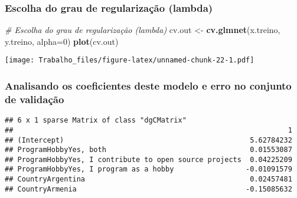 \documentclass[]{article}
\newenvironment{Shaded}{\begin{snugshade}}{\end{snugshade}}
\newcommand{\KeywordTok}[1]{\textcolor[rgb]{0.13,0.29,0.53}{\textbf{#1}}}
\newcommand{\DataTypeTok}[1]{\textcolor[rgb]{0.13,0.29,0.53}{#1}}
\newcommand{\DecValTok}[1]{\textcolor[rgb]{0.00,0.00,0.81}{#1}}
\newcommand{\StringTok}[1]{\textcolor[rgb]{0.31,0.60,0.02}{#1}}
\newcommand{\CommentTok}[1]{\textcolor[rgb]{0.56,0.35,0.01}{\textit{#1}}}
\newcommand{\OperatorTok}[1]{\textcolor[rgb]{0.81,0.36,0.00}{\textbf{#1}}}
\newcommand{\NormalTok}[1]{#1}
\begin{document}
\subsubsection{Escolha do grau de regularização
(lambda)}\label{escolha-do-grau-de-regularizacao-lambda}

\begin{Shaded}
\begin{Highlighting}[]
\CommentTok{# Escolha do grau de regularização (lambda)}
\NormalTok{cv.out <-}\StringTok{ }\KeywordTok{cv.glmnet}\NormalTok{(x.treino, y.treino, }\DataTypeTok{alpha=}\DecValTok{0}\NormalTok{)}
\KeywordTok{plot}\NormalTok{(cv.out)}
\end{Highlighting}
\end{Shaded}

\texttt{[image: Trabalho\_files/figure-latex/unnamed-chunk-22-1.pdf]}

\subsubsection{Analisando os coeficientes deste modelo e erro no
conjunto de
validação}\label{analisando-os-coeficientes-deste-modelo-e-erro-no-conjunto-de-validacao}

\begin{Shaded}
\end{Shaded}

\begin{verbatim}
## 6 x 1 sparse Matrix of class "dgCMatrix"
##                                                                 1
## (Intercept)                                            5.62784232
## ProgramHobbyYes, both                                  0.01553087
## ProgramHobbyYes, I contribute to open source projects  0.04225209
## ProgramHobbyYes, I program as a hobby                 -0.01091579
## CountryArgentina                                       0.02457481
## CountryArmenia                                        -0.15085632
\end{verbatim}
\end{document}
